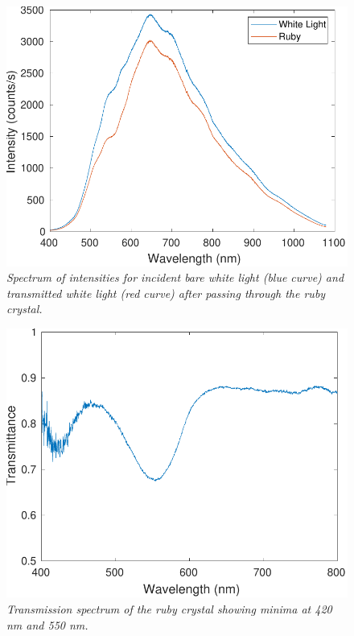 \documentclass[11pt, a4paper, twocolumn]{article}
\begin{document}
\begin{figure} %
\includegraphics[width=\linewidth]{doubleIntensityMeasurement.pdf}
\caption{\textit{Spectrum of intensities for incident bare white light (blue curve) and transmitted white light (red curve) after passing through the ruby crystal.}}
\label{fig:doubleIntensityMeasurement}
\end{figure}

\begin{figure} [t]
\includegraphics[width=\linewidth]{transmissionSpectrum.pdf}
\caption{\textit{Transmission spectrum of the ruby crystal showing minima at 420 nm and 550 nm.}}
\label{fig:transmissionSpectrum}
\end{figure}
\end{document}
